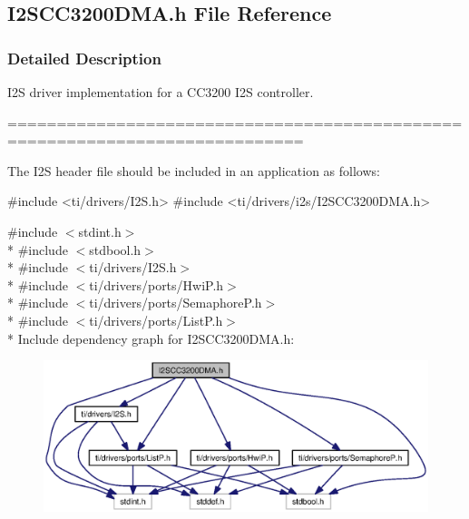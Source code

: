 \subsection{I2\+S\+C\+C3200\+D\+M\+A.\+h File Reference}
\label{_i2_s_c_c3200_d_m_a_8h}


\subsubsection{Detailed Description}
I2\+S driver implementation for a C\+C3200 I2\+S controller. 

============================================================================

The I2\+S header file should be included in an application as follows\+: 
\begin{DoxyCode}
\textcolor{preprocessor}{#include <ti/drivers/I2S.h>}
\textcolor{preprocessor}{#include <ti/drivers/i2s/I2SCC3200DMA.h>}
\end{DoxyCode}
 

{\ttfamily \#include $<$stdint.\+h$>$}\\*
{\ttfamily \#include $<$stdbool.\+h$>$}\\*
{\ttfamily \#include $<$ti/drivers/\+I2\+S.\+h$>$}\\*
{\ttfamily \#include $<$ti/drivers/ports/\+Hwi\+P.\+h$>$}\\*
{\ttfamily \#include $<$ti/drivers/ports/\+Semaphore\+P.\+h$>$}\\*
{\ttfamily \#include $<$ti/drivers/ports/\+List\+P.\+h$>$}\\*
Include dependency graph for I2\+S\+C\+C3200\+D\+M\+A.\+h\+:
\nopagebreak
\begin{figure}[H]
\begin{center}
\leavevmode
\includegraphics[width=350pt]{_i2_s_c_c3200_d_m_a_8h__incl}
\end{center}
\end{figure}
